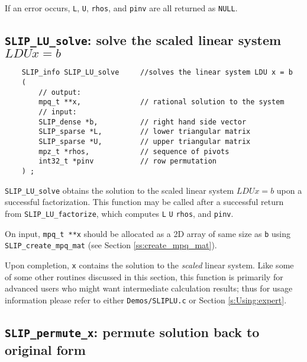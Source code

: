 \documentclass[12pt]{article}
\theoremstyle{definition}
\begin{document}
If an error occurs, \verb|L|, \verb|U|, \verb|rhos|, and \verb|pinv| are all
returned as \verb|NULL|.

\cprotect\subsection{\verb|SLIP_LU_solve|: solve the scaled linear system $LDUx=b$}
\label{ss:SLIP_LU_solve}

\begin{mdframed}[userdefinedwidth=6in]
{\footnotesize
\begin{verbatim}
    SLIP_info SLIP_LU_solve     //solves the linear system LDU x = b
    (
        // output:
        mpq_t **x,              // rational solution to the system
        // input:
        SLIP_dense *b,          // right hand side vector
        SLIP_sparse *L,         // lower triangular matrix
        SLIP_sparse *U,         // upper triangular matrix
        mpz_t *rhos,            // sequence of pivots
        int32_t *pinv           // row permutation
    ) ;
\end{verbatim}
} \end{mdframed}

\verb|SLIP_LU_solve| obtains the solution to the scaled linear system $LDUx=b$
upon a successful factorization.  This function may be called after a
successful return from \verb|SLIP_LU_factorize|, which computes \verb|L|
\verb|U| \verb|rhos|, and \verb|pinv|. 

On input, \verb|mpq_t **x| should be allocated as a 2D array of same size as
\verb|b| using \verb|SLIP_create_mpq_mat| (see Section
\ref{ss:create_mpq_mat}).

Upon completion, \verb|x| contains the solution to the \textit{scaled} linear
system. Like some of some other routines discussed in this section, this
function is primarily for advanced users who might want intermediate
calculation results; thus for usage information please refer to either
\verb|Demos/SLIPLU.c| or Section \ref{s:Using:expert}.

\cprotect\subsection{\verb|SLIP_permute_x|: permute solution back to original form}
\label{ss:SLIP_permute_x}
\end{document}
